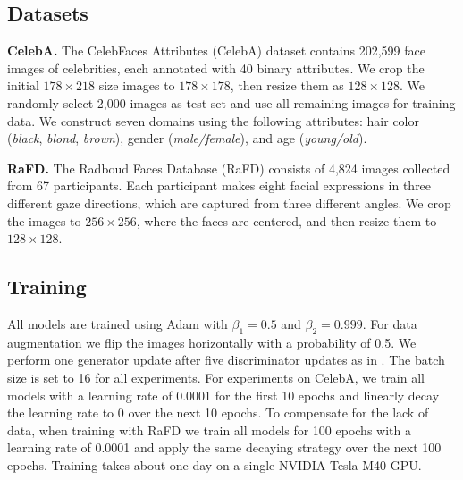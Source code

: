 \documentclass[10pt,twocolumn,letterpaper]{article}
\begin{document}

\medskip

\subsection{Datasets}
\noindent \textbf{CelebA.} The CelebFaces Attributes (CelebA) dataset \cite{liu2015faceattributes} contains 202,599 face images of celebrities, each annotated with 40 binary attributes. We crop the initial $178 \times 218$ size images to $178 \times 178$, then resize them as $128 \times 128$. We randomly select 2,000 images as test set and use all remaining images for training data. We construct seven domains using the following attributes: hair color (\textit{black}, \textit{blond}, \textit{brown}), gender (\textit{male/female}), and age (\textit{young/old}). 

\medskip

\noindent \textbf{RaFD.} The Radboud Faces Database (RaFD) \cite{langner2010presentation} consists of 4,824 images collected from 67 participants. Each participant makes eight facial expressions in three different gaze directions, which are captured from three different angles. We crop the images to $256 \times 256$,  where the faces are centered, and then resize them to $128 \times 128$. 

\medskip

\subsection{Training}
All models are trained using Adam \cite{kingma2014adam} with ${\beta}_{1}=0.5$ and ${\beta}_{2}=0.999$. For data augmentation we flip the images horizontally with a probability of 0.5. We perform one generator update after five discriminator updates as in \cite{gulrajani2017improved}. The batch size is set to 16 for all experiments. For experiments on CelebA,  we train all models with a learning rate of 0.0001 for the first 10 epochs and linearly decay the learning rate to 0 over the next 10 epochs. To compensate for the lack of data, when training with RaFD we train all models for 100 epochs with a learning rate of 0.0001 and apply the same decaying strategy over the next 100 epochs. Training takes about one day on a single NVIDIA Tesla M40 GPU. 
\end{document}
